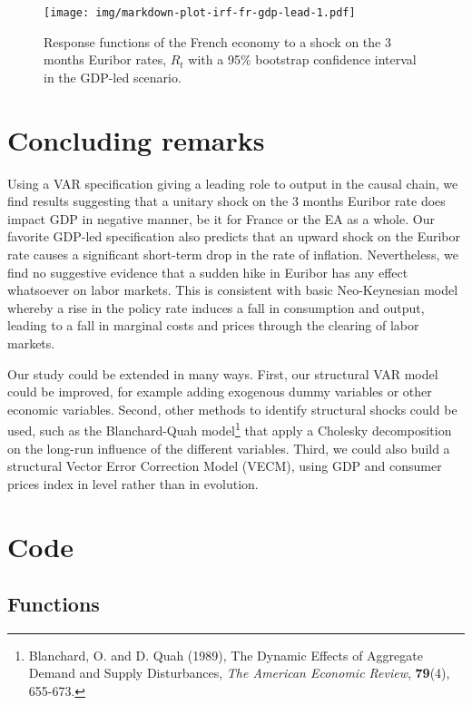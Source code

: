 \documentclass[
  11pt,
]{article}
\begin{document}
\begin{figure}
\centering
\texttt{[image: img/markdown-plot-irf-fr-gdp-lead-1.pdf]}
\caption{\label{fig:plot-irf-fr-gdp-lead}Response functions of the French economy to a shock on the 3 months Euribor rates, \(R_t\) with a 95\% bootstrap confidence interval in the GDP-led scenario.}
\end{figure}

\newpage

\hypertarget{concluding-remarks}{%
\section{Concluding remarks}\label{concluding-remarks}}

Using a VAR specification giving a leading role to output in the causal chain, we find results suggesting that a unitary shock on the 3 months Euribor rate does impact GDP in negative manner, be it for France or the EA as a whole.
Our favorite GDP-led specification also predicts that an upward shock on the Euribor rate causes a significant short-term drop in the rate of inflation.
Nevertheless, we find no suggestive evidence that a sudden hike in Euribor has any effect whatsoever on labor markets.
This is consistent with basic Neo-Keynesian model whereby a rise in the policy rate induces a fall in consumption and output, leading to a fall in marginal costs and prices through the clearing of labor markets.

Our study could be extended in many ways.
First, our structural VAR model could be improved, for example adding exogenous dummy variables or other economic variables.
Second, other methods to identify structural shocks could be used, such as the Blanchard-Quah model\footnote{
  Blanchard, O. and D. Quah (1989), The Dynamic Effects of Aggregate Demand and Supply Disturbances, \emph{The American Economic Review}, \textbf{79}(4), 655-673.} that apply a Cholesky decomposition on the long-run influence of the different variables.
Third, we could also build a structural Vector Error Correction Model (VECM), using GDP and consumer prices index in level rather than in evolution.

\newpage
\appendix

\hypertarget{sec:code}{%
\section{Code}\label{sec:code}}

\hypertarget{functions}{%
\subsection{Functions}\label{functions}}
\end{document}
